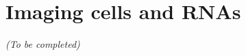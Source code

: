 

\section{Imaging cells and RNAs}
\label{sec:fish}

\begin{center}
	\textit{(To be completed)}
\end{center}



